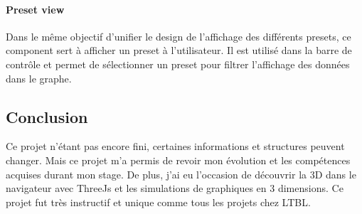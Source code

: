 \paragraph{Preset view} Dans le même objectif d'unifier le design de l'affichage des différents presets, ce component sert à afficher un preset à l'utilisateur.
Il est utilisé dans la barre de contrôle et permet de sélectionner un preset pour filtrer l'affichage des données dans le graphe.

\subsection{Conclusion}
\label{biomerieuxBiopediaConclusion}

Ce projet n'étant pas encore fini, certaines informations et structures peuvent changer.
Mais ce projet m'a permis de revoir mon évolution et les compétences acquises durant mon stage.
De plus, j'ai eu l'occasion de découvrir la 3D dans le navigateur avec ThreeJs et les simulations de graphiques en 3 dimensions.
Ce projet fut très instructif et unique comme tous les projets chez LTBL.
